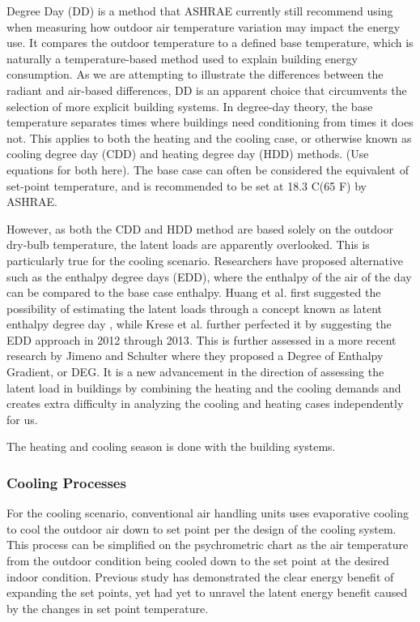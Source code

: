 
Degree Day (DD) is a method that ASHRAE currently still recommend using when measuring how outdoor air temperature variation may impact the energy use\cite{ansi/ashrae_standard_2017}. It compares the outdoor temperature to a defined base temperature, which is naturally a temperature-based method used to explain building energy consumption. As we are attempting to illustrate the differences between the radiant and air-based differences, DD is an apparent choice that circumvents the selection of more explicit building systems. In degree-day theory, the base temperature separates times where buildings need conditioning from times it does not\cite{krese_analysis_2012}. This applies to both the heating and the cooling case, or otherwise known as cooling degree day (CDD) and heating degree day (HDD) methods. (Use equations for both here).  The base case can often be considered the equivalent of set-point temperature, and is recommended to be set at 18.3 C(65 F) by ASHRAE.

However, as both the CDD and HDD method are based solely on the outdoor dry-bulb temperature, the latent loads are apparently overlooked. This is particularly true for the cooling scenario. Researchers have proposed alternative such as the enthalpy degree days (EDD), where the enthalpy of the air of the day can be compared to the base case enthalpy. Huang et al. first suggested the possibility of estimating the latent loads through a concept known as latent enthalpy degree day \cite{huang_climatic_1986}, while Krese et al. further perfected it by suggesting the EDD approach in 2012 through 2013\cite{krese_incorporation_2011,rosiek_reducing_2013}. This is further assessed in a more recent research by Jimeno and Schulter where they proposed a Degree of Enthalpy Gradient\cite{fonseca_daily_2020}, or DEG. It is a new advancement in the direction of assessing the latent load in buildings by combining the heating and the cooling demands and creates extra difficulty in analyzing the cooling and heating cases independently for us. 

The heating and cooling season is done with the building systems. 

\subsubsection{Cooling Processes}
    For the cooling scenario, conventional air handling units uses evaporative cooling to cool the outdoor air down to set point per the design of the cooling system. This process can be simplified on the psychrometric chart as the air temperature from the outdoor condition being cooled down to the set point at the desired indoor condition. Previous study has demonstrated the clear energy benefit of expanding the set points, yet had yet to unravel the latent energy benefit caused by the changes in set point temperature.

